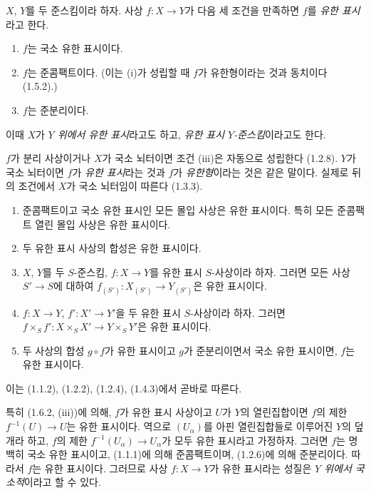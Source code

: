 \begin{definition}[1.6.1]
\label{IV.1.6.1-fr}
$X$, $Y$를 두 준스킴이라 하자. 사상 $f:X\to Y$가 다음 세 조건을
만족하면 $f$를 \emph{유한 표시}라고 한다.
\begin{enumerate}
  \item[(i)] $f$는 국소 유한 표시이다.
  \item[(ii)] $f$는 준콤팩트이다. (이는 (i)가 성립할 때 $f$가
  유한형이라는 것과 동치이다 (1.5.2).)
  \item[(iii)] $f$는 준분리이다.
\end{enumerate}
이때 $X$가 \emph{$Y$ 위에서 유한 표시}라고도 하고,
\emph{유한 표시 $Y$-준스킴}이라고도 한다.
\end{definition}

$f$가 분리 사상이거나 $X$가 국소 뇌터이면 조건 (iii)은 자동으로
성립한다 (1.2.8). $Y$가 국소 뇌터이면 $f$가 \emph{유한 표시}라는
것과 $f$가 \emph{유한형}이라는 것은 같은 말이다. 실제로 뒤의
조건에서 $X$가 국소 뇌터임이 따른다 (1.3.3).


\begin{proposition}[1.6.2]
\label{IV.1.6.2-fr}
\begin{enumerate}
  \item[(i)] 준콤팩트이고 국소 유한 표시인 모든 몰입 사상은 유한
  표시이다. 특히 모든 준콤팩트 열린 몰입 사상은 유한 표시이다.
  \item[(ii)] 두 유한 표시 사상의 합성은 유한 표시이다.
  \item[(iii)] $X$, $Y$를 두 $S$-준스킴, $f:X\to Y$를 유한 표시
  $S$-사상이라 하자. 그러면 모든 사상 $S'\to S$에 대하여
  $f_{(S')}:X_{(S')}\to Y_{(S')}$은 유한 표시이다.
  \item[(iv)] $f:X\to Y$, $f':X'\to Y'$을 두 유한 표시 $S$-사상이라
  하자. 그러면
  $f\times_Sf':X\times_SX'\to Y\times_SY'$은 유한 표시이다.
  \item[(v)] 두 사상의 합성 $g\circ f$가 유한 표시이고 $g$가
  준분리이면서 국소 유한 표시이면, $f$는 유한 표시이다.
\end{enumerate}
\end{proposition}

이는 (1.1.2), (1.2.2), (1.2.4), (1.4.3)에서 곧바로 따른다.

특히 (1.6.2, (iii))에 의해, $f$가 유한 표시 사상이고 $U$가 $Y$의
열린집합이면 $f$의 제한 $f^{-1}(U)\to U$는 유한 표시이다. 역으로
$(U_\alpha)$를 아핀 열린집합들로 이루어진 $Y$의 덮개라 하고,
$f$의 제한 $f^{-1}(U_\alpha)\to U_\alpha$가 모두 유한 표시라고
가정하자. 그러면 $f$는 명백히 국소 유한 표시이고, (1.1.1)에 의해
준콤팩트이며, (1.2.6)에 의해 준분리이다. 따라서 $f$는 유한
표시이다. 그러므로 사상 $f:X\to Y$가 유한 표시라는 성질은
\emph{$Y$ 위에서 국소적}이라고 할 수 있다.

